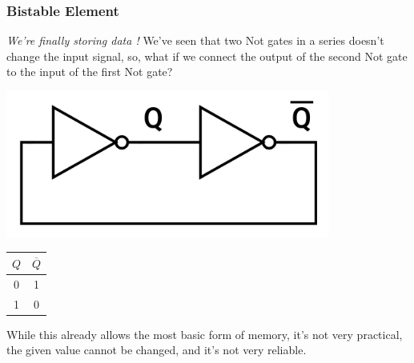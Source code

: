 \documentclass[12pt,openany]{book}
\begin{document}
\subsubsection{Bistable Element}
\textit{We're finally storing data !} \newline
We've seen that two Not gates in a series doesn't change the input signal, so, what if we connect the output of the second Not gate to the input of the first Not gate? \newline


\vspace*{20px} 
\noindent
\begin{minipage}{0.40\textwidth}
	\begin{center}
		\includegraphics[width=0.80\textwidth]{circuits/12.1.3.png}
	\end{center}
\end{minipage}
\hfill
\vline
\hfill
\begin{minipage}{0.50\textwidth}
	\begin{center}
		\large
		\begin{tabular}{|c|c|}
			\hline
			
			$Q$ & $\overline{Q}$ \\
			\hline
			0 & 1 \\
			1 & 0 \\
			\hline
		\end{tabular}
	\end{center}
\end{minipage}
\newline
\vspace*{15px}
While this already allows the most basic form of memory, it's not very practical, the given value cannot be changed, and it's not very reliable.

\newpage
\end{document}
